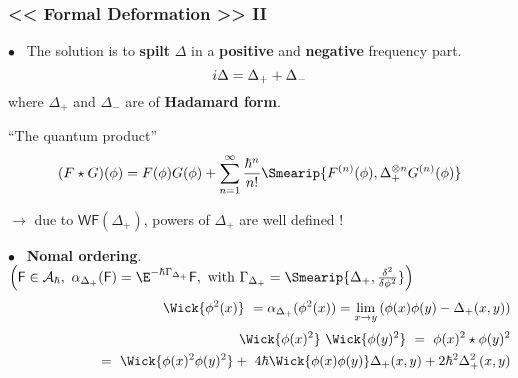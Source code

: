 \documentclass[9pt]{beamer}
\newcommand{\WF}{\mathsf{WF}} %
\newcommand{\Acal}{\mathcal{A}}
\newcommand{\Fsf}{\mathsf{F}}
\begin{document}
\begin{frame}

\frametitle{<< Formal Deformation >> II}

\vfill

$\bullet$ \ The solution is to \textbf{spilt} $\Delta$ in a \textbf{positive} and \textbf{negative} frequency part.
\vspace*{-10pt}
\begin{equation*}
i\Delta = \Delta_+ + \Delta_- 
\vspace*{-10pt}
\end{equation*}
\hspace*{8pt} where $\Delta_+$ and $\Delta_-$ are of \textbf{Hadamard form}.

\vfill 

\begin{block}{``The quantum product''}
\vspace*{-16pt}
\begin{equation*}
 (F \star G)(\phi) = F(\phi) G(\phi) + \sum_{n=1}^\infty \frac{\hbar^n}{n!} \Smearip{F^{(n)}(\phi), \Delta_+^{\otimes n} G^{(n)}(\phi)} 
\end{equation*}
\vspace*{-8pt}
\end{block}

$\to$ due to $\WF(\Delta_+)$, powers of $\Delta_+$ are well defined !

\vfill

$\bullet$ \ \textbf{Nomal ordering}. \ 
$\left( \Fsf \in \Acal_\hbar, \ \alpha_{\Delta_+}(\Fsf) = \E^{-\hbar \Gamma_{\Delta_+}} \Fsf, \mbox{ with } \Gamma_{\Delta_+} = \Smearip{\Delta_+,\frac{\delta^2}{\delta\phi^2}} \right)$ 
\begin{eqnarray*}
&& \hspace*{-6pt} \Wick{\phi^2(x)} \ = \alpha_{\Delta_+}(\phi^2(x)) = \underset{x\to y}{\lim} \left( \phi(x)\phi(y) - \Delta_+(x,y) \right) \\[2pt]
&& \hspace*{-6pt} \Wick{\phi(x)^2} \ \Wick{\phi(y)^2} \ = \ \phi(x)^2 \star \phi(y)^2 \\
&& \hspace*{58pt} = \ \Wick{\phi(x)^2 \phi(y)^2} + \ 4 \hbar \Wick{\phi(x) \phi(y)}  \Delta_+(x,y) + 2 \hbar^2 \Delta^2_+(x,y)
\end{eqnarray*}

\vfill

\end{frame}

\end{document}
